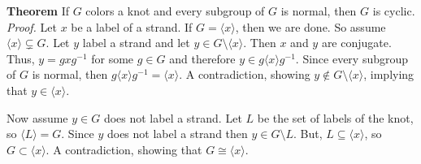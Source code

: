 \documentclass[letterpaper, 11pt]{article}
\newcommand{\cyclic}[1]{\langle #1 \rangle}
\newcommand{\inv}{^{-1}}
\begin{document}
\textbf{Theorem} If $G$ colors a knot and every subgroup of $G$ is normal, then $G$ is cyclic.\\

\emph{Proof.} Let $x$ be a label of a strand. If $G = \langle x \rangle$, then we are done. So assume
$\cyclic{x} \subsetneq G$. Let $y$ label a strand and let $y \in G \setminus \cyclic{x}$. Then $x$
and $y$ are conjugate. Thus, 
$y = gxg\inv$ for some $ g \in G$
and therefore $y \in g \cyclic{x} g\inv$. Since every subgroup of $G$ is normal, then $g\cyclic{x}
g\inv = \cyclic{x}$. A contradiction, showing $y \notin G \setminus \cyclic{x}$, implying that $y
\in \cyclic{x}$.  

Now assume $y \in G$ does not label a strand. Let $L$ be the set of labels of the knot, so
$\cyclic{L} = G$. Since $y$ does not label a strand then $y \in G \setminus L$. But, $L \subseteq
\cyclic{x}$, so $G \subset \cyclic{x}$. A contradiction, showing that $G \cong \cyclic{x}$.  
\end{document}
